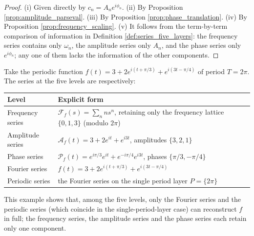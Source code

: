 \begin{proof}
(i) Given directly by $c_n=A_n e^{i\phi_n}$.
(ii) By Proposition \ref{prop:amplitude_parseval}.
(iii) By Proposition \ref{prop:phase_translation}.
(iv) By Proposition \ref{prop:frequency_scaling}.
(v) It follows from the term-by-term comparison of information in Definition \ref{def:series_five_layers}: the frequency series contains only $\omega_n$, the amplitude series only $A_n$, and the phase series only $e^{i\phi_n}$; any one of them lacks the information of the other components.
\end{proof}

\begin{example}\label{ex:five_layers_example}
Take the periodic function $f(t) = 3 + 2 e^{i(t + \pi/3)} + e^{i(3t - \pi/4)}$ of period $T = 2\pi$. The series at the five levels are respectively:
\begin{center}
\begin{tabular}{@{}>{\raggedright\arraybackslash}p{2.8cm}>{\raggedright\arraybackslash}p{9.0cm}@{}}
\toprule
Level & Explicit form \\
\midrule
Frequency series & $\mathcal{F}_f(s) = \sum_n n s^n$, retaining only the frequency lattice $\{0, 1, 3\}$ (modulo $2\pi$) \\
Amplitude series & $\mathcal{A}_f(t) = 3 + 2 e^{it} + e^{i3t}$, amplitudes $\{3, 2, 1\}$ \\
Phase series & $\mathcal{P}_f(t) = e^{i\pi/3} e^{it} + e^{-i\pi/4} e^{i3t}$, phases $\{\pi/3, -\pi/4\}$ \\
Fourier series & $f(t) = 3 + 2 e^{i(t+\pi/3)} + e^{i(3t-\pi/4)}$ \\
Periodic series & the Fourier series on the single period layer $P = \{2\pi\}$ \\
\bottomrule
\end{tabular}
\end{center}
This example shows that, among the five levels, only the Fourier series and the periodic series (which coincide in the single-period-layer case) can reconstruct $f$ in full; the frequency series, the amplitude series and the phase series each retain only one component.
\end{example}

